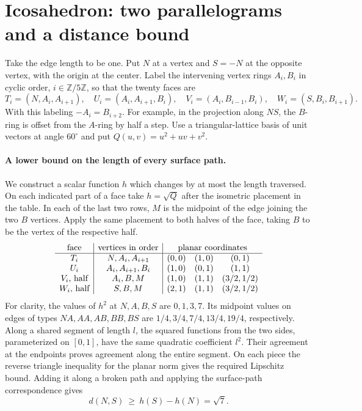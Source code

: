 \section{Icosahedron: two parallelograms and a distance bound}

Take the edge length to be one. Put $N$ at a vertex and $S=-N$ at the
opposite vertex, with the origin at the center. Label the intervening
vertex rings $A_i,B_i$ in cyclic order, $i\in\mathbb Z/5\mathbb Z$, so
that the twenty faces are
\[
 T_i=(N,A_i,A_{i+1}),\quad U_i=(A_i,A_{i+1},B_i),\quad
 V_i=(A_i,B_{i-1},B_i),\quad W_i=(S,B_i,B_{i+1}).
\]
With this labeling $-A_i=B_{i+2}$. For example, in the projection along
$NS$, the $B$-ring is offset from the $A$-ring by half a step. Use a
triangular-lattice basis of unit vectors at angle $60^\circ$ and put
$Q(u,v)=u^2+uv+v^2$.

\paragraph{A lower bound on the length of every surface path.}
We construct a scalar function $h$ which changes by at most the length
traversed. On each indicated part of a face take $h=\sqrt Q$ after the
isometric placement in the table. In each of the last two rows, $M$ is
the midpoint of the edge joining the two $B$ vertices. Apply the same
placement to both halves of the face, taking $B$ to be the vertex of
the respective half.
\[
\begin{array}{c|c|ccc}
\text{face}&\text{vertices in order}&\multicolumn{3}{c}{\text{planar coordinates}}\\ \hline
T_i&N,A_i,A_{i+1}&(0,0)&(1,0)&(0,1)\\
U_i&A_i,A_{i+1},B_i&(1,0)&(0,1)&(1,1)\\
V_i\text{, half}& A_i,B,M&(1,0)&(1,1)&(3/2,1/2)\\
W_i\text{, half}& S,B,M&(2,1)&(1,1)&(3/2,1/2)
\end{array}
\]
For clarity, the values of $h^2$ at $N,A,B,S$ are $0,1,3,7$.
Its midpoint values on edges of types $NA,AA,AB,BB,BS$ are
$1/4,3/4,7/4,13/4,19/4$, respectively. Along a shared segment of
length $l$, the squared functions from the two sides, parameterized on
$[0,1]$, have the same quadratic coefficient $l^2$. Their agreement
at the endpoints proves agreement along the entire segment. On each
piece the reverse triangle inequality for the planar norm gives the
required Lipschitz bound. Adding it along a broken path and applying
the surface-path correspondence gives
\[
 d(N,S)\ \geq\ h(S)-h(N)=\sqrt7 .
\]

